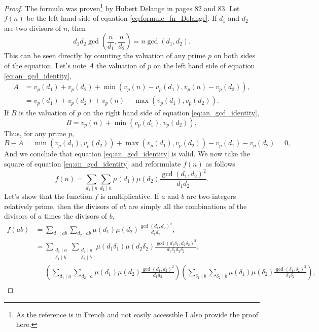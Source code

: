 \documentclass[a4paper,12pt]{article}
\begin{document}
\begin{proof} The formula was proven\footnote{As the reference is in French and not easily accessible I also provide the proof here.} by Hubert Delange in \cite{delange1968distribution} pages 82 and 83. Let $f(n)$ be the left hand side of equation \ref{eq:formule_fn_Delange}. If $d_1$ and $d_2$ are two divisors of $n$, then
\begin{equation}
d_1 d_2 \gcd\left(\frac{n}{d_1},\frac{n}{d_2}\right) = n \gcd(d_1,d_2).
\label{eq:an_gcd_identity}
\end{equation}
This can be seen directly by counting the valuation of any prime $p$ on both sides of the equation. Let's note $A$ the valuation of $p$ on the left hand side of equation \ref{eq:an_gcd_identity},
\begin{align*}
A
&= v_p(d_1)+v_p(d_2)+\min\left(v_p(n)-v_p(d_1),v_p(n)-v_p(d_2)\right), \\
& =v_p(d_1)+v_p(d_2)+v_p(n)-\max(v_p(d_1),v_p(d_2)).
\end{align*}
If $B$ is the valuation of $p$ on the right hand side of equation \ref{eq:an_gcd_identity},
\begin{equation*}
B = v_p(n)+\min(v_p(d_1),v_p(d_2)),
\end{equation*}
Thus, for any prime $p$,
\begin{equation*}
B-A=\min(v_p(d_1),v_p(d_2))+\max(v_p(d_1),v_p(d_2))-v_p(d_1)-v_p(d_2)=0,
\end{equation*}
And we conclude that equation \ref{eq:an_gcd_identity} is valid. We now take the square of equation \ref{eq:an_gcd_identity} and reformulate $f(n)$ as follows
\begin{equation*}
f(n) =  \sum_{d_1 \mid n} \sum_{d_2 \mid n} \mu(d_1) \mu(d_2) \frac{\gcd(d_1,d_2)^2}{d_1d_2}.
\end{equation*}
Let's show that the function $f$ is multiplicative. If $a$ and $b$ are two integers relatively prime, then the divisors of $ab$ are simply all the combinations of the divisors of $a$ times the divisors of $b$,
\begin{align*}
f(ab)
&= \sum_{d_1 \mid ab} \sum_{d_2 \mid ab} \mu(d_1) \mu(d_2) \frac{\gcd(d_1,d_2)^2}{d_1d_2}, \\
&= \sum_{\substack{d_1 \mid a\\ \delta_1 \mid b}} \sum_{\substack{d_2 \mid a\\ \delta_2 \mid b}} \mu(d_1\delta_1) \mu(d_2\delta_2) \frac{\gcd(d_1\delta_1,d_2\delta_2)^2}{d_1\delta_1d_2\delta_2} ,\\
&= \left( \sum_{d_1 \mid a} \sum_{d_2 \mid a} \mu(d_1) \mu(d_2) \frac{\gcd(d_1,d_2)^2}{d_1d_2} \right) \left( \sum_{\delta_1 \mid b} \sum_{\delta_2 \mid b} \mu(\delta_1) \mu(\delta_2) \frac{\gcd(\delta_1,\delta_2)^2}{\delta_1\delta_2} \right), \\

\end{align*}
\end{proof}
\end{document}
